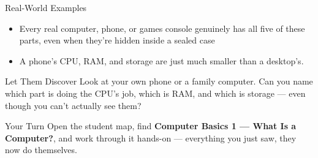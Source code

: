 \documentclass[aspectratio=169]{beamer}
\begin{document}
\begin{frame}{Real-World Examples}
    \large
    \begin{itemize}
        \item Every real computer, phone, or games console genuinely has all five of these parts, even when they're hidden inside a sealed case
        \item A phone's CPU, RAM, and storage are just much smaller than a desktop's.
    \end{itemize}
\end{frame}


\begin{frame}{Let Them Discover}
    \Large
    Look at your own phone or a family computer. Can you name which part is doing the CPU's job, which is RAM, and which is storage — even though you can't actually see them?
\end{frame}

\begin{frame}{Your Turn}
    \Large
    Open the student map, find \textbf{Computer Basics 1 — What Is a Computer?}, and work through it
    hands-on --- everything you just saw, they now do themselves.
\end{frame}
\end{document}
